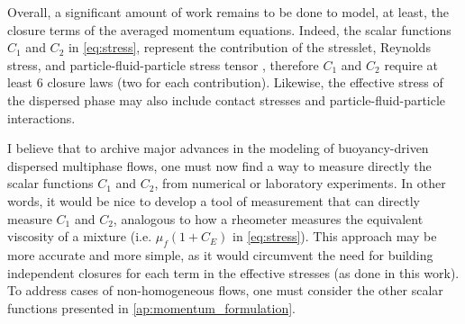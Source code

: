 Overall, a significant amount of work remains to be done to model, at least, the closure terms of the averaged momentum equations. 
Indeed, the scalar functions $C_1$ and $C_2$ in \ref{eq:stress}, represent the contribution of the stresslet, Reynolds stress, and particle-fluid-particle stress tensor \citep{zhang2021ensemble}, therefore $C_1$ and $C_2$ require at least 6 closure laws (two for each contribution). 
Likewise, the effective stress of the dispersed phase may also include contact stresses and particle-fluid-particle interactions.  

I believe that to archive major advances in the modeling of buoyancy-driven dispersed multiphase flows, one must now find a way to measure directly the scalar functions $C_1$ and $C_2$, from numerical or laboratory experiments.
In other words, it would be nice to develop a tool of measurement that can directly measure $C_1$ and $C_2$, analogous to how a rheometer measures the equivalent viscosity of a mixture (i.e. $\mu_f(1+C_E)$ in \ref{eq:stress}). 
This approach may be more accurate and more simple, as 
it would circumvent the need for building independent closures for each term in the effective stresses (as done in this work). 
To address cases of non-homogeneous flows, one must consider the other scalar functions presented in \ref{ap:momentum_formulation}.  